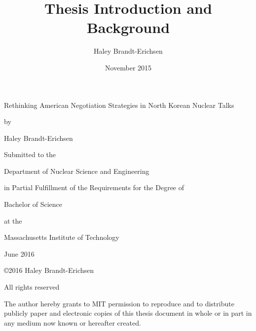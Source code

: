 \documentclass{article}
\title{Thesis Introduction and Background}
\author{Haley Brandt-Erichsen}
\date{November 2015}
\begin{document}
\begin{titlepage}
    {\centering
    Rethinking American Negotiation Strategies in North Korean Nuclear Talks \par
    \vspace{0.5cm}
    by \par
    \vspace{0.5cm}
    Haley Brandt-Erichsen \par
    \vspace{0.5cm}
    Submitted to the \par Department of Nuclear Science and Engineering \par in Partial Fulfillment of the Requirements for the Degree of \par
    \vspace{0.5cm}
    Bachelor of Science \par
    \vspace{0.5cm}
    at the \par
    \vspace{0.5cm}
    Massachusetts Institute of Technology \par
    \vspace{0.5cm}
    June 2016 \par
    \vspace{0.5cm}
    \copyright 2016 Haley Brandt-Erichsen \par All rights reserved \par
    \vspace{0.5cm}
    The author hereby grants to MIT permission to reproduce and to
distribute publicly paper and electronic copies of this thesis document in whole or in part
in any medium now known or hereafter created. \par
    }
    \vfill
    

\end{titlepage}
\end{document}
